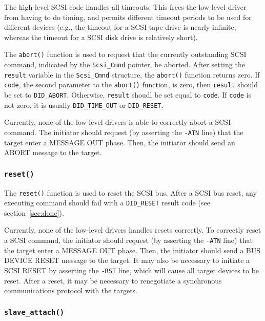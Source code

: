 The high-level SCSI code handles all timeouts.  This frees the low-level
driver from having to do timing, and permits different timeout periods to
be used for different devices (e.g., the timeout for a SCSI tape drive is
nearly infinite, whereas the timeout for a SCSI disk drive is relatively
short).

The {\tt abort()} function is used to request that the currently
outstanding SCSI command, indicated by the \verb|Scsi_Cmnd| pointer, be
aborted.  After setting the \verb|result| variable in the \verb|Scsi_Cmnd|
structure, the \verb|abort()| function returns zero.  If \verb|code|, the
second parameter to the \verb|abort()| function, is zero, then
\verb|result| should be set to \verb|DID_ABORT|\@.  Otherwise,
\verb|result| shoudl be set equal to \verb|code|\@.  If \verb|code| is not
zero, it is usually \verb|DID_TIME_OUT| or \verb|DID_RESET|\@.

Currently, none of the low-level drivers is able to correctly abort a SCSI
command.  The initiator should request (by asserting the \verb|-ATN| line)
that the target enter a MESSAGE OUT phase.  Then, the initiator should send
an ABORT message to the target.




\subsubsection{{\tt reset()}}
\label{sec:reset}


The {\tt reset()} function is used to reset the SCSI bus.  After a SCSI bus
reset, any executing command should fail with a \verb|DID_RESET| result
code (see section~\ref{sec:done}).

Currently, none of the low-level drivers handles resets correctly.  To
correctly reset a SCSI command, the initiator should request (by asserting
the \verb|-ATN| line) that the target enter a MESSAGE OUT phase.  Then, the
initiator should send a BUS DEVICE RESET message to the target.  It may
also be necessary to initiate a SCSI RESET by asserting the \verb|-RST|
line, which will cause all target devices to be reset.  After a reset, it
may be necessary to renegotiate a synchronous communications protocol with
the targets.


\subsubsection{{\tt slave\_attach()}}

